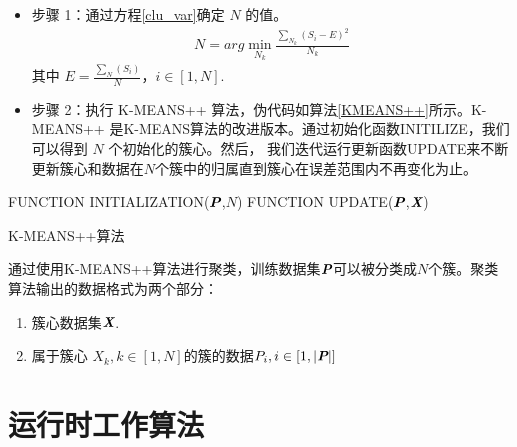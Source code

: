\begin{itemize}
	\item 步骤 1：通过方程\ref{clu_var}确定 $N$ 的值。
	\begin{eqnarray}\label{clu_var}
	N=arg\min \limits_{N_{k}}{\frac{\sum _{N_{k}}(S_{i}-E)^{2}}{N_{k}}}
	\end{eqnarray}
	其中 $E = \frac{\sum _{N}(S_{i})}{N}$，$i\in [1,N]$.
	\item 步骤 2：执行 K-MEANS++ 算法，伪代码如算法\ref{KMEANS++}所示。K-MEANS++ 是K-MEANS算法的改进版本。通过初始化函数INITILIZE，我们可以得到 $N$ 个初始化的簇心。然后， 我们迭代运行更新函数UPDATE来不断更新簇心和数据在$N$个簇中的归属直到簇心在误差范围内不再变化为止。
\end{itemize}

\begin{algorithm}[h]
	FUNCTION INITIALIZATION($\textit{\textbf{P}}$,$N$) 
	FUNCTION UPDATE($\textit{\textbf{P}}$,$\textit{\textbf{X}}$) 
	
	\caption{K-MEANS++算法}
	\label{KMEANS++}
\end{algorithm}

通过使用K-MEANS++算法进行聚类，训练数据集$\textit{\textbf{P}}$可以被分类成$N$个簇。聚类算法输出的数据格式为两个部分：
\begin{enumerate}
	\item 簇心数据集$\textit{\textbf{X}}$.
	\item 属于簇心 $X_{k},k \in [1,N]$的簇的数据$P_{i},i \in [1,\vert \textit{\textbf{P}} \vert]$
\end{enumerate}

\section{运行时工作算法}

